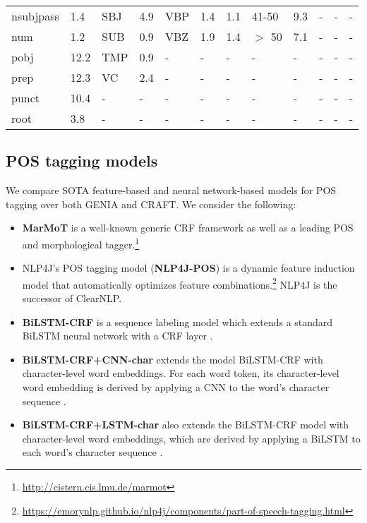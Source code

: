 \documentclass[twocolumn,hyperref]{bmcart}\pdfoutput=1
\begin{document}
\begin{table*}[!t]
\begin{tabular}{ll|ll|lll|ll|rll}
nsubjpass & 1.4 &SBJ & 4.9 &VBP & 1.4  & 1.1 &41-50 & 9.3 &  - & -  & -\\ 
num & 1.2 &SUB & 0.9 & VBZ & 1.9  & 1.4 &  $>$ 50 & 7.1 & - & -  & - \\ 
pobj & 12.2 &TMP & 0.9 & - & - & -& - & - & - & -  & - \\prep & 12.3 &VC & 2.4 & - & - & - & - & - & - & -  & - \\ 
punct & 10.4 & - & - &  - & - & - & - & -& - & -  & - \\ 
root & 3.8 & - & - &  - & - & - & - & -& - & -  & - \\ 
\hline
\end{tabular}
\label{tab:statistics}
\end{table*}





\subsection*{POS tagging models}

We compare SOTA feature-based
and neural network-based models for POS tagging over both GENIA and CRAFT. We consider the following:

\begin{itemize}

	\item \textbf{MarMoT}    \cite{mueller-schmid-schutze:2013:EMNLP} is a well-known generic CRF framework as well as a leading POS and morphological tagger.\footnote{{\url{http://cistern.cis.lmu.de/marmot}}}

	\item {NLP4J}'s   POS  tagging model \cite{choi:2016:N16-1} (\textbf{NLP4J-POS}) is a dynamic feature induction model that automatically optimizes feature combinations.\footnote{{\url{https://emorynlp.github.io/nlp4j/components/part-of-speech-tagging.html}}} NLP4J is the successor of ClearNLP.

    \item \textbf{BiLSTM-CRF}  \cite{HuangXY15} is a sequence labeling model which extends a standard BiLSTM neural network \cite{Schuster1997BRN,HochreiterSchmidhuber1997b} with a CRF layer \cite{Lafferty:2001}.
    
    \item \textbf{BiLSTM-CRF+CNN-char} extends the  model BiLSTM-CRF with character-level word embeddings. For each word token, its  character-level word embedding is derived by applying a CNN to the word's character sequence  \cite{ma-hovy:2016:P16-1}. 
    
    \item \textbf{BiLSTM-CRF+LSTM-char}   also extends the BiLSTM-CRF model with character-level word embeddings, which are derived by applying a BiLSTM to each word's character sequence \cite{lample-EtAl:2016:N16-1}.
    
\end{itemize}
\end{document}
